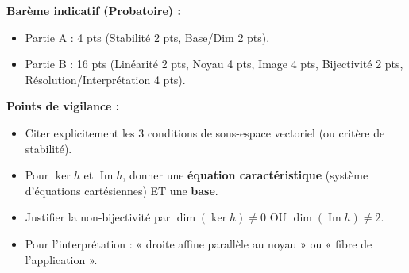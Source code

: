 \documentclass[11pt]{article}
\begin{document}
\begin{corrige}
\vspace{0.5em}
\noindent\textbf{Barème indicatif (Probatoire) :}
\begin{itemize}
    \item Partie A : 4 pts (Stabilité 2 pts, Base/Dim 2 pts).
    \item Partie B : 16 pts (Linéarité 2 pts, Noyau 4 pts, Image 4 pts, Bijectivité 2 pts, Résolution/Interprétation 4 pts).
\end{itemize}
\noindent\textbf{Points de vigilance :}
\begin{itemize}
    \item Citer explicitement les 3 conditions de sous-espace vectoriel (ou critère de stabilité).
    \item Pour $\ker h$ et $\operatorname{Im} h$, donner une \textbf{équation caractéristique} (système d'équations cartésiennes) ET une \textbf{base}.
    \item Justifier la non-bijectivité par $\dim(\ker h)\neq 0$ OU $\dim(\operatorname{Im} h)\neq 2$.
    \item Pour l'interprétation : « droite affine parallèle au noyau » ou « fibre de l'application ».
\end{itemize}
\end{corrige}
\end{document}
